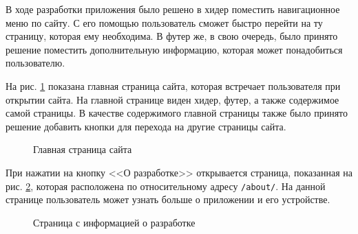 \documentclass[a4paper, 14pt]{extarticle}
\begin{document}
В ходе разработки приложения было решено в хидер поместить навигационное меню по
сайту. С его помощью пользователь сможет быстро перейти на ту страницу, которая
ему необходима. В футер же, в свою очередь, было принято решение поместить
дополнительную информацию, которая может понадобиться пользователю.

На рис. \ref{fig:index} показана главная страница сайта, которая встречает
пользователя при открытии сайта. На главной странице виден хидер, футер, а также
содержимое самой страницы. В качестве содержимого главной страницы также было
принято решение добавить кнопки для перехода на другие страницы сайта.

\begin{figure}[H]
  \centering
  \caption{Главная страница сайта}
  \label{fig:index}
\end{figure}

При нажатии на кнопку <<О разработке>> открывается страница, показанная на рис.
\ref{fig:about}, которая расположена по относительному адресу \texttt{/about/}.
На данной странице пользователь может узнать больше о приложении и его
устройстве.

\begin{figure}[H]
  \centering
  \caption{Страница с информацией о разработке}
  \label{fig:about}
\end{figure}
\end{document}
